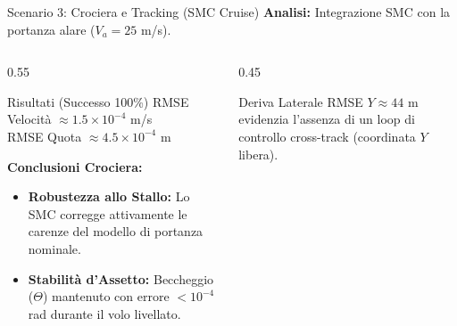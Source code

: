 \documentclass[aspectratio=169]{beamer} %
\begin{document}
\begin{frame}{Scenario 3: Crociera e Tracking (SMC Cruise)}
    \textbf{Analisi:} Integrazione SMC con la portanza alare ($V_a = 25$ m/s).
    
    \begin{columns}[c]
        \begin{column}{0.55\textwidth}
            \begin{block}{Risultati (Successo 100\%)}
                \centering
                RMSE Velocità $\approx 1.5 \times 10^{-4}$ m/s \\
                RMSE Quota $\approx 4.5 \times 10^{-4}$ m
            \end{block}
            \textbf{Conclusioni Crociera:}
            \begin{itemize}
                \item \textbf{Robustezza allo Stallo:} Lo SMC corregge attivamente le carenze del modello di portanza nominale.
                \item \textbf{Stabilità d'Assetto:} Beccheggio ($\Theta$) mantenuto con errore $< 10^{-4}$ rad durante il volo livellato.
            \end{itemize}
        \end{column}
        
        \begin{column}{0.45\textwidth}
            \begin{alertblock}{Deriva Laterale}
                RMSE $Y \approx 44$ m evidenzia l'assenza di un loop di controllo cross-track (coordinata $Y$ libera).
            \end{alertblock}
        \end{column}
    \end{columns}
\end{frame}
\end{document}
